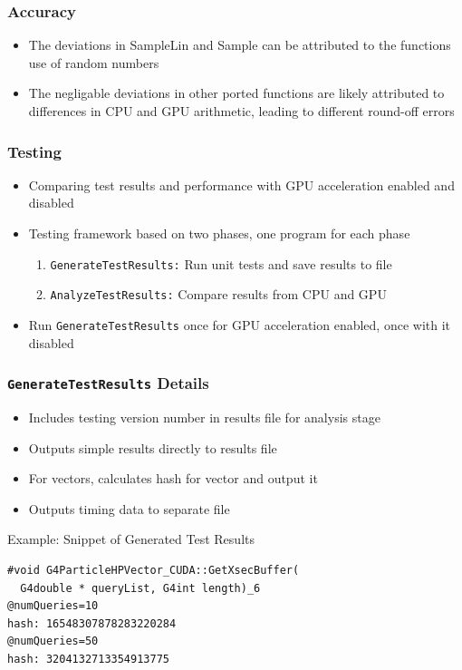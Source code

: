 \documentclass{beamer}
\begin{document}
\begin{frame}
\frametitle{Accuracy}
\begin{itemize}
\item The deviations in SampleLin and Sample can be 
attributed to the functions use of random numbers
\item The negligable deviations in other ported functions 
are likely attributed to differences in CPU and GPU 
arithmetic, leading to different round-off errors
\end{itemize}
\end{frame}

\begin{frame}
\frametitle{Testing}
\begin{itemize}
\item Comparing test results and performance with GPU acceleration enabled and disabled
\item Testing framework based on two phases, one program for each phase
\begin{enumerate}
\item \texttt{GenerateTestResults:} Run unit tests and save results to file
\item \texttt{AnalyzeTestResults:} Compare results from CPU and GPU
\end{enumerate}
\item Run \texttt{GenerateTestResults} once for GPU acceleration enabled, once with it disabled
\end{itemize}
\end{frame}

\begin{frame}[fragile]
\frametitle{\texttt{GenerateTestResults} Details}
\begin{itemize}
\item Includes testing version number in results file for analysis stage
\item Outputs simple results directly to results file
\item For vectors, calculates hash for vector and output it
\item Outputs timing data to separate file
\end{itemize}
\begin{block}{Example: Snippet of Generated Test Results}
\begin{lstlisting}
#void G4ParticleHPVector_CUDA::GetXsecBuffer(
  G4double * queryList, G4int length)_6
@numQueries=10
hash: 16548307878283220284
@numQueries=50
hash: 3204132713354913775
\end{lstlisting}
\end{block}
\end{frame}
\end{document}
